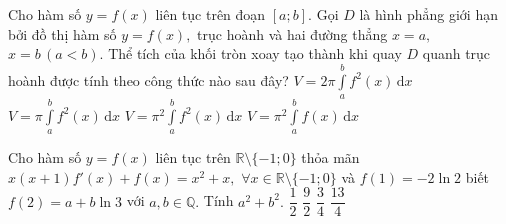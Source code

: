\begin{ex}%
Cho hàm số $y=f(x)$ liên tục trên đoạn $[a;b].$ Gọi $D$ là hình phẳng giới hạn bởi đồ thị hàm số $y=f(x),$ trục hoành và hai đường thẳng $x=a,$ $x=b\, (a<b).$ Thể tích của khối tròn xoay tạo thành khi quay $D$ quanh trục hoành được tính theo công thức nào sau đây?
\choice
{$V=2\pi\displaystyle\int\limits_{a}^{b}f^2(x)\mathrm{\,d}x$}
{\True $V=\pi\displaystyle\int\limits_{a}^{b}f^2(x)\mathrm{\,d}x$}
{$V=\pi^2\displaystyle\int\limits_{a}^{b}f^2(x)\mathrm{\,d}x$}
{$V=\pi^2\displaystyle\int\limits_{a}^{b}f(x)\mathrm{\,d}x$}
\end{ex}

\begin{ex}%
Cho hàm số $y=f(x)$ liên tục trên $\mathbb{R}\setminus \{-1;0\}$ thỏa mãn $x(x+1)f'(x)+f(x)=x^2+x,$ $\forall x\in \mathbb{R}\setminus\{-1; 0\}$ và $f(1)=-2\ln 2$ biết $f(2)=a+b\ln 3$ với $a, b\in \mathbb{Q}.$ Tính $a^2+b^2.$
\choice
{$\dfrac{1}{2}$}
{\True $\dfrac{9}{2}$}
{$\dfrac{3}{4}$}
{$\dfrac{13}{4}$}
\end{ex}

